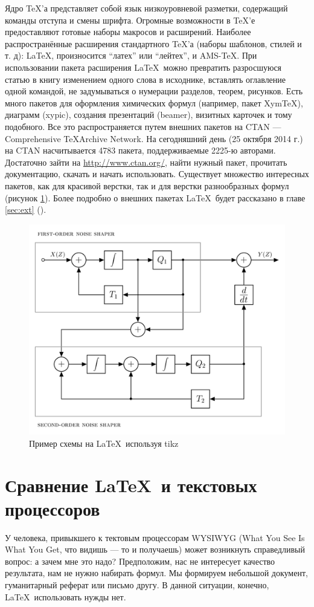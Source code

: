 Ядро \TeX’а представляет собой язык низкоуровневой разметки, содержащий команды отступа и смены шрифта. Огромные возможности в \TeX’е предоставляют готовые наборы макросов и расширений. Наиболее распространённые расширения стандартного \TeX’а (наборы шаблонов, стилей и т. д): \LaTeX, произносится ``латех'' или ``лейтех'', и AMS-\TeX. При использовании пакета расширения \LaTeX~можно превратить разросшуюся статью в книгу изменением одного слова в исходнике, вставлять оглавление одной командой, не задумываться о нумерации разделов, теорем, рисунков. Есть много пакетов для оформления химических формул (например, пакет Xym\TeX), диаграмм (xypic), создания презентаций (beamer), визитных карточек и тому подобного. Все это распространяется путем внешних пакетов на CTAN --- Comprehensive \TeX Archive Network. На сегодняшний день (25 октября 2014 г.) на CTAN насчитывается 4783 пакета, поддерживаемые 2225-ю авторами. Достаточно зайти на \url{http://www.ctan.org/}, найти нужный пакет, прочитать документацию, скачать и начать использовать. Существует множество интересных пакетов, как для красивой верстки, так и для верстки разнообразных формул (рисунок \ref{fig:example}). Более подробно о внешних пакетах \LaTeX~будет рассказано в главе \ref{sec:ext} ().

\begin{figure}[ht]
    \includegraphics[width=.6\linewidth]{Figures/example.png}
    \caption{Пример схемы на \LaTeX~используя tikz}
    \label{fig:example}
\end{figure}

\section{Сравнение \LaTeX~и текстовых процессоров} %

У человека, привыкшего к тектовым процессорам WYSIWYG (What You See Is What You Get, что видишь --- то и получаешь) может возникнуть справедливый вопрос: а зачем мне это надо? Предположим, нас не интересует качество результата, нам не нужно набирать формул. Мы формируем небольшой документ, гуманитарный реферат или письмо другу. В данной ситуации, конечно, \LaTeX~использовать нужды нет.

